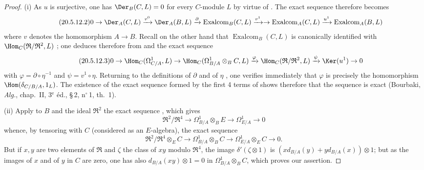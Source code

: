 \begin{proof}
(i) As $u$ is surjective, one has $\Der_B(C,L)=0$ for every $C$-module $L$ by virtue of . The exact sequence  therefore becomes
\begin{equation}
\tag{20.5.12.2}
  \label{0.20.5.12.2}
  0\to\Der_A(C,L)\xrightarrow{v^0}\Der_A(B,L)\xrightarrow{\partial}\operatorname{Exalcom}_B(C,L)\xrightarrow{v^1}
  \to\operatorname{Exalcom}_A(C,L)\xrightarrow{u^1}\operatorname{Exalcom}_A(B,L)
\end{equation}
where $v$ denotes the homomorphism $A\to B$.
Recall on the other hand that $\operatorname{Exalcom}_B(C,L)$ is canonically identified with $\Hom_C(\mathfrak{R}/\mathfrak{R}^2,L)$ ; one deduces therefore from  and  the exact sequence
\begin{equation}
\tag{20.5.12.3}
  \label{0.20.5.12.3}
  0\to\Hom_C(\Omega^1_{C/A},L)\to\Hom_C(\Omega^1_{B/A}\otimes_B C,L)\xrightarrow{\varphi}\Hom_C(\mathfrak{R}/\mathfrak{R}^2,L)\xrightarrow{\psi}\Ker(u^1)\to 0
\end{equation}
with $\varphi=\partial\circ\eta^{-1}$ and $\psi=v^1\circ\eta$.
Returning to the definitions of $\partial$  and of $\eta$ , one verifies immediately that $\varphi$ is precisely the homomorphism $\Hom(\delta_{C/B/A},1_L)$.
The existence of the exact sequence formed by the first 4 terms of  shows therefore that the sequence  is exact (Bourbaki, \emph{Alg.}, chap.~II, 3$^\text{e}$ \'{e}d., \S\,2, n$^\circ$\,1, th.~1).

\medskip
(ii) Apply to $B$ and the ideal $\mathfrak{R}^2$ the exact sequence , which gives
\begin{equation}
\tag{20.5.12.4}
  \label{0.20.5.12.4}
  \mathfrak{R}^2/\mathfrak{R}^4\to\Omega^1_{B/A}\otimes_B E\to\Omega^1_{E/A}\to 0
\end{equation}
whence, by tensoring with $C$ (considered as an $E$-algebra), the exact sequence
\[
  \mathfrak{R}^2/\mathfrak{R}^4\otimes_E C\to\Omega^1_{B/A}\otimes_B C\to\Omega^1_{E/A}\otimes_E C\to 0.
\]
But if $x,y$ are two elements of $\mathfrak{R}$ and $\zeta$ the class of $xy$ modulo $\mathfrak{R}^4$, the image $\delta'(\zeta\otimes 1)$ is $(xd_{B/A}(y)+yd_{B/A}(x))\otimes 1$; but as the images of $x$ and of $y$ in $C$ are zero, one has also $d_{B/A}(xy)\otimes 1=0$ in $\Omega^1_{B/A}\otimes_B C$, which proves our assertion.


\end{proof}
